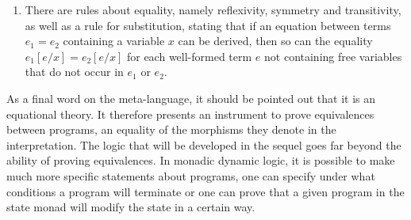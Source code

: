 \begin{enumerate}
\item There are rules about equality, namely reflexivity, symmetry and
  transitivity, as well as a rule for substitution, stating that if an
  equation between terms $e_1 = e_2$ containing a variable $x$ can be derived,
  then so can the equality $e_1[e/x] = e_2[e/x]$ for each well-formed term $e$
  not containing free variables that do not occur in $e_1$ or $e_2$.
\end{enumerate}


As a final word on the meta-language, it should be pointed out that it is an
equational theory. It therefore presents an instrument to prove equivalences
between programs, \IE an equality of the morphisms they denote in the
interpretation. The logic that will be developed in the sequel goes far beyond
the ability of proving equivalences. In monadic dynamic logic, it is possible to
make much more specific statements about programs, \EG one can specify under
what conditions a program will terminate or one can prove that a given program
in the state monad will modify the state in a certain way.






